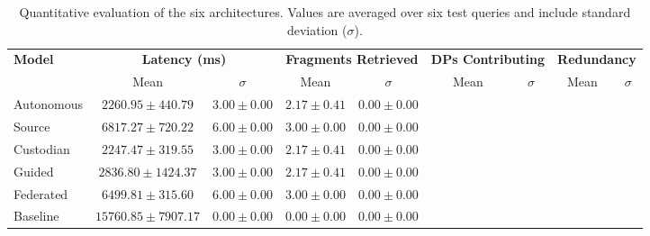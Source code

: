
\begin{table}[htbp]
\centering
\caption{Quantitative evaluation of the six architectures. Values are averaged over six test queries and include standard deviation ($\sigma$).}
\label{tab:quantitative-results}
\begin{tabular}{|l|cc|cc|cc|cc|}
\hline
\textbf{Model} & \multicolumn{2}{c|}{\textbf{Latency (ms)}} & \multicolumn{2}{c|}{\textbf{Fragments Retrieved}} & \multicolumn{2}{c|}{\textbf{DPs Contributing}} & \multicolumn{2}{c|}{\textbf{Redundancy}} \\
              & Mean & $\sigma$ & Mean & $\sigma$ & Mean & $\sigma$ & Mean & $\sigma$ \\
\hline
Autonomous   & $2260.95 \pm 440.79$ & $3.00 \pm 0.00$ & $2.17 \pm 0.41$ & $0.00 \pm 0.00$ \\
Source       & $6817.27 \pm 720.22$ & $6.00 \pm 0.00$ & $3.00 \pm 0.00$ & $0.00 \pm 0.00$ \\
Custodian    & $2247.47 \pm 319.55$ & $3.00 \pm 0.00$ & $2.17 \pm 0.41$ & $0.00 \pm 0.00$ \\
Guided       & $2836.80 \pm 1424.37$ & $3.00 \pm 0.00$ & $2.17 \pm 0.41$ & $0.00 \pm 0.00$ \\
Federated    & $6499.81 \pm 315.60$ & $6.00 \pm 0.00$ & $3.00 \pm 0.00$ & $0.00 \pm 0.00$ \\
Baseline     & $15760.85 \pm 7907.17$ & $0.00 \pm 0.00$ & $0.00 \pm 0.00$ & $0.00 \pm 0.00$ \\
\hline
\end{tabular}
\end{table}
